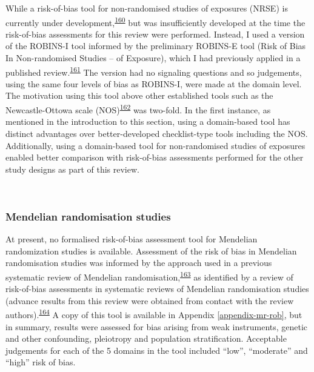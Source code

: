 \documentclass[a4paper, twoside]{templates/ociamthesis}
\begin{document}
While a risk-of-bias tool for non-randomised studies of exposures (NRSE) is currently under development,\textsuperscript{\protect\hyperlink{ref-morganr2020}{160}} but was insufficiently developed at the time the risk-of-bias assessments for this review were performed. Instead, I used a version of the ROBINS-I tool informed by the preliminary ROBINS-E tool (Risk of Bias In Non-randomised Studies -- of Exposure), which I had previously applied in a published review.\textsuperscript{\protect\hyperlink{ref-french2019}{161}} The version had no signaling questions and so judgements, using the same four levels of bias as ROBINS-I, were made at the domain level. The motivation using this tool above other established tools such as the Newcastle-Ottowa scale (NOS)\textsuperscript{\protect\hyperlink{ref-wells2000}{162}} was two-fold. In the first instance, as mentioned in the introduction to this section, using a domain-based tool has distinct advantages over better-developed checklist-type tools including the NOS. Additionally, using a domain-based tool for non-randomised studies of exposures enabled better comparison with risk-of-bias assessments performed for the other study designs as part of this review.

~

\hypertarget{mendelian-randomisation-studies}{%
\subsubsection{Mendelian randomisation studies}\label{mendelian-randomisation-studies}}

At present, no formalised risk-of-bias assessment tool for Mendelian randomization studies is available. Assessment of the risk of bias in Mendelian randomisation studies was informed by the approach used in a previous systematic review of Mendelian randomisation,\textsuperscript{\protect\hyperlink{ref-mamluk2020}{163}} as identified by a review of risk-of-bias assessments in systematic reviews of Mendelian randomisation studies (advance results from this review were obtained from contact with the review authors).\textsuperscript{\protect\hyperlink{ref-spiga2021}{164}} A copy of this tool is available in Appendix \ref{appendix-mr-rob}, but in summary, results were assessed for bias arising from weak instruments, genetic and other confounding, pleiotropy and population stratification. Acceptable judgements for each of the 5 domains in the tool included ``low'', ``moderate'' and ``high'' risk of bias.

~
\end{document}
